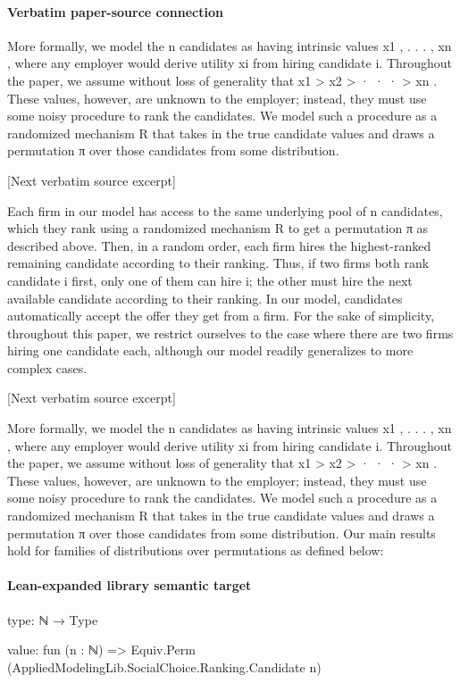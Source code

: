 \documentclass[10pt]{article}
\begin{document}
\paragraph{Verbatim paper-source connection}
\begin{ReviewVerbatim}
More formally, we model the n candidates as having intrinsic values x1 , . . . , xn , where any employer would
derive utility xi from hiring candidate i. Throughout the paper, we assume without loss of generality that
x1 > x2 > · · · > xn . These values, however, are unknown to the employer; instead, they must use some
noisy procedure to rank the candidates. We model such a procedure as a randomized mechanism R that
takes in the true candidate values and draws a permutation π over those candidates from some distribution.

[Next verbatim source excerpt]

Each firm in our model has access to the same underlying pool of n candidates, which they rank using
a randomized mechanism R to get a permutation π as described above. Then, in a random order, each
firm hires the highest-ranked remaining candidate according to their ranking. Thus, if two firms both rank
candidate i first, only one of them can hire i; the other must hire the next available candidate according to
their ranking. In our model, candidates automatically accept the offer they get from a firm. For the sake
of simplicity, throughout this paper, we restrict ourselves to the case where there are two firms hiring one
candidate each, although our model readily generalizes to more complex cases.

[Next verbatim source excerpt]

More formally, we model the n candidates as having intrinsic values x1 , . . . , xn , where any employer would
derive utility xi from hiring candidate i. Throughout the paper, we assume without loss of generality that
x1 > x2 > · · · > xn . These values, however, are unknown to the employer; instead, they must use some
noisy procedure to rank the candidates. We model such a procedure as a randomized mechanism R that
takes in the true candidate values and draws a permutation π over those candidates from some distribution.
Our main results hold for families of distributions over permutations as defined below:
\end{ReviewVerbatim}



\paragraph{Lean-expanded library semantic target}
\begin{ReviewVerbatim}
type:
ℕ → Type

value:
fun (n : ℕ) => Equiv.Perm (AppliedModelingLib.SocialChoice.Ranking.Candidate n)
\end{ReviewVerbatim}
\end{document}
